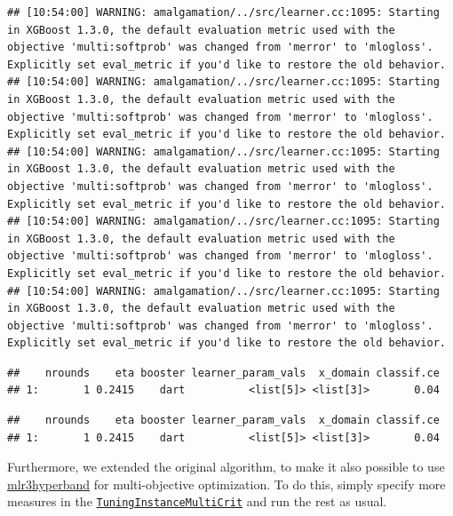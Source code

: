 \documentclass[
]{scrbook}
\newenvironment{Shaded}{\begin{snugshade}}{\end{snugshade}}
\newcommand{\NormalTok}[1]{#1}
\newcommand{\SpecialCharTok}[1]{\textcolor[rgb]{0.00,0.00,0.00}{#1}}
\renewenvironment{Shaded} {\begin{snugshade}\small} {\end{snugshade}}
\begin{document}
\begin{verbatim}
## [10:54:00] WARNING: amalgamation/../src/learner.cc:1095: Starting in XGBoost 1.3.0, the default evaluation metric used with the objective 'multi:softprob' was changed from 'merror' to 'mlogloss'. Explicitly set eval_metric if you'd like to restore the old behavior.
## [10:54:00] WARNING: amalgamation/../src/learner.cc:1095: Starting in XGBoost 1.3.0, the default evaluation metric used with the objective 'multi:softprob' was changed from 'merror' to 'mlogloss'. Explicitly set eval_metric if you'd like to restore the old behavior.
## [10:54:00] WARNING: amalgamation/../src/learner.cc:1095: Starting in XGBoost 1.3.0, the default evaluation metric used with the objective 'multi:softprob' was changed from 'merror' to 'mlogloss'. Explicitly set eval_metric if you'd like to restore the old behavior.
## [10:54:00] WARNING: amalgamation/../src/learner.cc:1095: Starting in XGBoost 1.3.0, the default evaluation metric used with the objective 'multi:softprob' was changed from 'merror' to 'mlogloss'. Explicitly set eval_metric if you'd like to restore the old behavior.
## [10:54:00] WARNING: amalgamation/../src/learner.cc:1095: Starting in XGBoost 1.3.0, the default evaluation metric used with the objective 'multi:softprob' was changed from 'merror' to 'mlogloss'. Explicitly set eval_metric if you'd like to restore the old behavior.
\end{verbatim}

\begin{verbatim}
##    nrounds    eta booster learner_param_vals  x_domain classif.ce
## 1:       1 0.2415    dart          <list[5]> <list[3]>       0.04
\end{verbatim}

\begin{Shaded}
\end{Shaded}

\begin{verbatim}
##    nrounds    eta booster learner_param_vals  x_domain classif.ce
## 1:       1 0.2415    dart          <list[5]> <list[3]>       0.04
\end{verbatim}

Furthermore, we extended the original algorithm, to make it also possible to use \href{https://mlr3hyperband.mlr-org.com}{mlr3hyperband} for multi-objective optimization.
To do this, simply specify more measures in the \href{https://mlr3tuning.mlr-org.com/reference/TuningInstanceMultiCrit.html}{\texttt{TuningInstanceMultiCrit}} and run the rest as usual.
\end{document}
